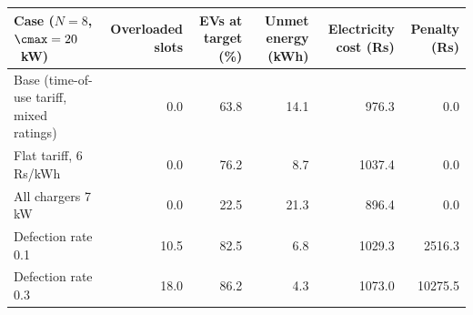\begin{tabular}{lrrrrr}
\toprule
Case ($N=8$, $\cmax=20$~kW) & Overloaded slots & EVs at target (\%) & Unmet energy (kWh) & Electricity cost (Rs) & Penalty (Rs) \\
\midrule
Base (time-of-use tariff, mixed ratings) & 0.0 & 63.8 & 14.1 & 976.3 & 0.0 \\
Flat tariff, 6 Rs/kWh & 0.0 & 76.2 & 8.7 & 1037.4 & 0.0 \\
All chargers 7 kW & 0.0 & 22.5 & 21.3 & 896.4 & 0.0 \\
Defection rate 0.1 & 10.5 & 82.5 & 6.8 & 1029.3 & 2516.3 \\
Defection rate 0.3 & 18.0 & 86.2 & 4.3 & 1073.0 & 10275.5 \\
\bottomrule
\end{tabular}
